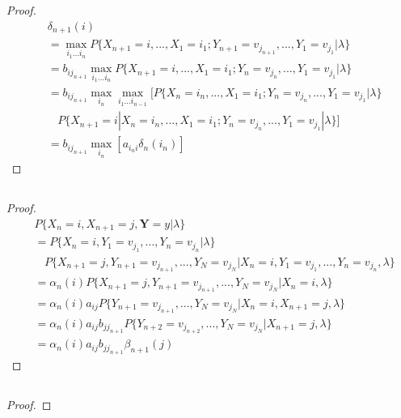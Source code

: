 \documentclass[runningheads]{llncs}
\begin{document}
    \subsection{}
    \begin{proof}
        \begin{align}
            &\delta_{n+1}(i) \\
            &= \max_{i_1...i_{n}} P \{ X_{n+1} = i,..., X_1 = i_1; Y_{n+1} = v_{j_{n+1}},..., Y_1 = v_{j_1} |\lambda \} \\
            &= b_{i j_{n+1}} \max_{i_1...i_{n}} P \{ X_{n+1} = i,..., X_1 = i_1; Y_{n} = v_{j_n},..., Y_1 = v_{j_1} |\lambda \} \\
            &= b_{i j_{n+1}} \max_{i_n} \max_{i_1...i_{n-1}} [ P \{ X_{n} = i_n,..., X_1 = i_1; Y_{n} = v_{j_n},..., Y_1 = v_{j_1} |\lambda \} \\
            & \ \ \ \ P \{ X_{n+1} = i | X_{n} = i_n,..., X_1 = i_1; Y_{n} = v_{j_n},..., Y_1 = v_{j_1} |\lambda \} ] \\
            &= b_{i j_{n+1}} \max_{i_n} [a_{i_n i} \delta_{n}(i_n)]
        \end{align}
    \end{proof}
    \subsection{}
    \begin{proof}
        \begin{align}
            &P \{ X_n = i, X_{n+1} = j, \mathbf{Y} = y | \lambda \} \\
            &= P \{ X_n = i, Y_1 = v_{j_1},..., Y_n = v_{j_n} | \lambda \} \\
            & \ \ \ \ P \{ X_{n+1} = j, Y_{n+1} = v_{j_{n+1}},..., Y_N = v_{j_N} | X_n = i, Y_1 = v_{j_1},..., Y_n = v_{j_n}, \lambda \} \\ 
            &= \alpha_n(i) P \{ X_{n+1} = j, Y_{n+1} = v_{j_{n+1}},..., Y_N = v_{j_N} | X_n = i, \lambda \} \\
            &= \alpha_n(i) a_{ij} P \{ Y_{n+1} = v_{j_{n+1}},..., Y_N = v_{j_N} | X_n = i, X_{n+1} = j, \lambda \} \\
            &= \alpha_n(i) a_{ij} b_{jj_{n+1}} P \{ Y_{n+2} = v_{j_{n+2}},..., Y_N = v_{j_N} | X_{n+1} = j, \lambda \} \\
            &= \alpha_n(i) a_{ij} b_{jj_{n+1}} \beta_{n+1} (j)
        \end{align}
    \end{proof}
    \subsection{}
    \begin{proof}
        
    \end{proof}
\end{document}
